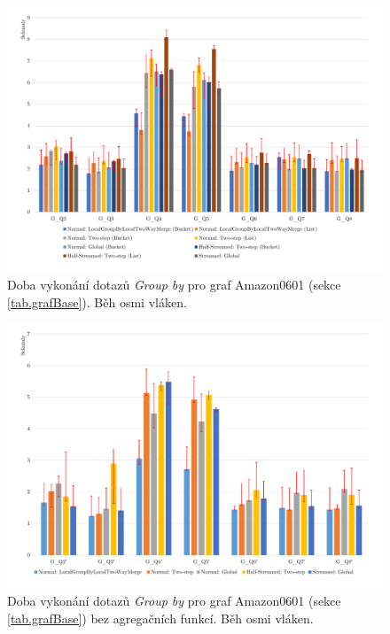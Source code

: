\begin{figure}[!htp]
\includegraphics[width=\linewidth]{../img/amazonGroupByPar.pdf}\centering
\caption{Doba vykonání dotazů \textit{Group by} pro graf Amazon0601 (sekce \ref{tab.grafBase}). Běh osmi vláken.}
\label{figure.amazonGroupByPar}
\end{figure}
\begin{figure}[!htp]
\includegraphics[width=\linewidth]{../img/amazonGroupByParNoAgg.pdf}\centering
\caption{Doba vykonání dotazů \textit{Group by} pro graf Amazon0601 (sekce \ref{tab.grafBase}) bez agregačních funkcí. Běh osmi vláken.}
\label{figure.amazonGroupByParNoAgg}
\end{figure}


